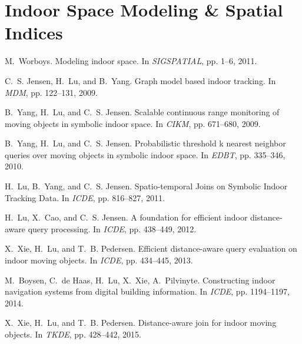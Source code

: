 \documentclass[a4paper, 11pt]{article} %
\begin{document}

\section{Indoor Space Modeling \& Spatial Indices}

\vspace{-25pt} %
\begin{thebibliography}{99}

M.~Worboys.
\newblock Modeling indoor space.
\newblock In {\em {SIGSPATIAL}}, pp. 1--6, 2011.

C.~S. Jensen, H.~Lu, and B.~Yang.
\newblock Graph model based indoor tracking.
\newblock In {\em {MDM}}, pp. 122--131, 2009.

B.~Yang, H.~Lu, and C.~S. Jensen.
\newblock Scalable continuous range monitoring of moving objects in symbolic
  indoor space.
\newblock In {\em CIKM}, pp. 671--680, 2009.

B.~Yang, H.~Lu, and C.~S. Jensen.
\newblock Probabilistic threshold k nearest neighbor queries over moving
  objects in symbolic indoor space.
\newblock In {\em EDBT}, pp. 335--346, 2010.

H.~Lu, B.~Yang, and C.~S. Jensen.
\newblock Spatio-temporal Joins on Symbolic Indoor Tracking Data.
\newblock In {\em {ICDE}}, pp. 816--827, 2011.

H.~Lu, X.~Cao, and C.~S. Jensen.
\newblock A foundation for efficient indoor distance-aware query processing.
\newblock In {\em ICDE}, pp. 438--449, 2012.

X.~Xie, H.~Lu, and T.~B. Pedersen.
\newblock Efficient distance-aware query evaluation on indoor moving objects.
\newblock In {\em ICDE}, pp. 434--445, 2013.

M.~Boysen, C.~de Haas, H.~Lu, X.~Xie, A.~Pilvinyte.
\newblock Constructing indoor navigation systems from digital building information.
\newblock In {\em ICDE}, pp. 1194--1197, 2014.

X.~Xie, H.~Lu, and T.~B. Pedersen.
\newblock Distance-aware join for indoor moving objects.
\newblock In {\em TKDE}, pp. 428--442, 2015.

\end{thebibliography}
\end{document}
